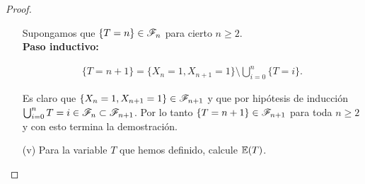 \begin{proof}
\begin{enumerate}
				Supongamos que $\{T = n\} \in \mathscr{F}_n$ para cierto $n \geq 2$.\\
				
			\textbf{Paso inductivo:}
				
				\begin{align}
					\{T = n + 1 \} = \{ X_n = 1, X_{n+1} = 1\} \setminus \bigcup_{i=0}^{n} \{T = i\}.
				\end{align}				
			
				Es claro que $\{ X_n = 1, X_{n+1} = 1\} \in \mathscr{F}_{n + 1}$ y que por hipótesis de inducción
				$\bigcup_{i=0}^{n} {T = i} \in \mathscr{F}_n \subset \mathscr{F}_{n + 1}$. Por lo tanto
				$\{T = n + 1 \} \in \mathscr{F}_{n+1}$ para toda $n \geq 2$ y con esto termina la demostración.\\
				
			
		\item[(v)] 
		Para la variable $T$ que hemos definido, calcule $\mathbb{E}\! \left( T \right)$.\\
		
	\end{enumerate}
\end{proof}